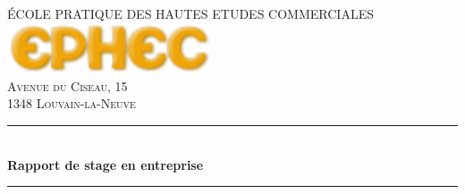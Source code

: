 \begin{titlepage}
\newcommand{\HRule}{\rule{\linewidth}{0.5mm}} %

\center %
 

\textsc{\LARGE ÉCOLE PRATIQUE DES HAUTES ETUDES COMMERCIALES}\\[1.5cm] %


\includegraphics[width=6cm]{ephec.png}\\[1cm] %
 

\textsc{\large Avenue du Ciseau, 15}\\[0.5cm] %
\textsc{\large 1348 Louvain-la-Neuve}\\[0.5cm] %


\HRule \\[0.4cm]
{ \huge \bfseries Rapport de stage en entreprise}\\[0.4cm] %
\HRule \\[0.4cm]
 


\end{titlepage}
